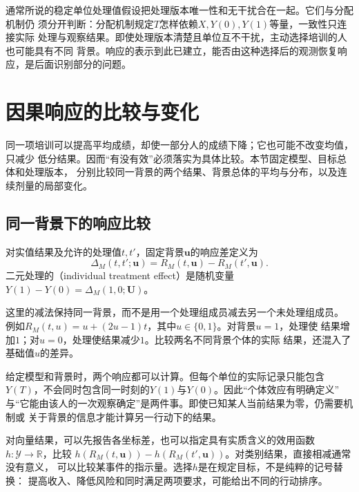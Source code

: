 通常所说的稳定单位处理值假设把处理版本唯一性和无干扰合在一起。它们与分配机制仍
须分开判断：分配机制规定\(T\)怎样依赖\(X,Y(0),Y(1)\)等量，一致性只连接实际
处理与观察结果。即使处理版本清楚且单位互不干扰，主动选择培训的人也可能具有不同
背景。响应的表示到此已建立，能否由这种选择后的观测恢复响应，是后面识别部分的问题。

\section{因果响应的比较与变化}
\label{sec:causal-response-comparison}

同一项培训可以提高平均成绩，却使一部分人的成绩下降；它也可能不改变均值，只减少
低分结果。因而“有没有效”必须落实为具体比较。本节固定模型、目标总体和处理版本，
分别比较同一背景的两个结果、背景总体的平均与分布，以及连续剂量的局部变化。

\subsection{同一背景下的响应比较}
\label{sec:causal-individual-response}

\begin{definition}[同一背景下的响应差]
  \label{def:causal-individual-effect}
  对实值结果及允许的处理值\(t,t'\)，固定背景\(\bm u\)的响应差定义为
  \begin{equation}
    \Delta_M(t,t';\bm u)=R_M(t,\bm u)-R_M(t',\bm u).
    \label{eq:causal-individual-response-difference}
  \end{equation}
  二元处理的（individual treatment effect）是随机变量
  \(Y(1)-Y(0)=\Delta_M(1,0;\bm U)\)。
\end{definition}

这里的减法保持同一背景，而不是用一个处理组成员减去另一个未处理组成员。
例如\(R_M(t,u)=u+(2u-1)t\)，其中\(u\in\{0,1\}\)。对背景\(u=1\)，处理使
结果增加\(1\)；对\(u=0\)，处理使结果减少\(1\)。比较两名不同背景个体的实际
结果，还混入了基础值\(u\)的差异。

给定模型和背景时，两个响应都可以计算。但每个单位的实际记录只能包含
\(Y(T)\)，不会同时包含同一时刻的\(Y(1)\)与\(Y(0)\)。因此“个体效应有明确定义”
与“它能由该人的一次观察确定”是两件事。即使已知某人当前结果为零，仍需要机制或
关于背景的信息才能计算另一行动下的结果。

对向量结果，可以先报告各坐标差，也可以指定具有实质含义的效用函数
\(h:\mathcal Y\to\mathbb R\)，比较
\(h(R_M(t,\bm u))-h(R_M(t',\bm u))\)。对类别结果，直接相减通常没有意义，
可以比较某事件的指示量。选择\(h\)是在规定目标，不是纯粹的记号替换：
提高收入、降低风险和同时满足两项要求，可能给出不同的行动排序。

